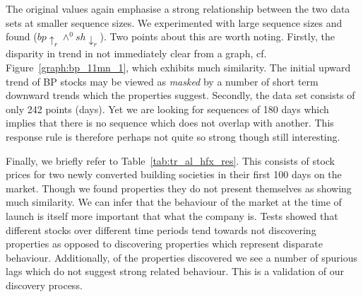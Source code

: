 {\begin{table}[ht]
\begin{center}
\end{center}
\caption{\label{tab:tr_bp_sh_res}Results for 242 days of BP and Shell
		from Dec 1997 to Oct 1998} 
\end{table}
}

The original values again emphasise a strong relationship between the
two data sets at smaller sequence sizes. We experimented with large
sequence sizes and found 
 ($bp \uparrow_r \wedge^0 sh \downarrow_r$). Two points
about this are worth noting. Firstly, the disparity in trend in not
immediately clear from a graph, cf. Figure~\ref{graph:bp_11mn_1},
which exhibits much similarity. The initial upward trend of BP stocks
may be viewed as {\em masked} by a number of short term downward
trends which the properties suggest.
Secondly, the data set consists of
only 242 points (days). Yet we are looking for sequences of 180 days
which implies that there is no sequence which does not overlap with
another. This response rule is therefore perhaps not quite so strong
though still interesting. 

\medskip

Finally, we briefly refer to Table~\ref{tab:tr_al_hfx_res}. This
consists of stock prices for two newly converted building societies in
their first 100 days on the market. Though we found properties they do
not present themselves as showing much similarity. We can infer that
the behaviour of the market at the time of launch is itself more
important that what the company is. Tests showed that different stocks
over different time periods tend towards not discovering properties as
opposed to discovering properties which represent disparate
behaviour.  Additionally, of the properties discovered we see a number
of spurious lags which do not suggest strong related behaviour. This
is a validation of our discovery process. 
 
